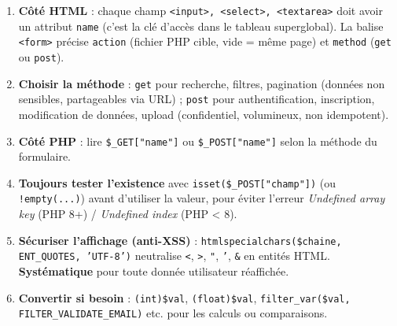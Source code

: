\documentclass[11pt]{article}
\begin{document}
\begin{methode}
\begin{enumerate}
  \item \textbf{Côté HTML} : chaque champ \texttt{<input>, <select>, <textarea>} doit avoir un attribut \texttt{name} (c'est la clé d'accès dans le tableau superglobal). La balise \texttt{<form>} précise \texttt{action} (fichier PHP cible, vide = même page) et \texttt{method} (\texttt{get} ou \texttt{post}).
  \item \textbf{Choisir la méthode} : \texttt{get} pour recherche, filtres, pagination (données non sensibles, partageables via URL) ; \texttt{post} pour authentification, inscription, modification de données, upload (confidentiel, volumineux, non idempotent).
  \item \textbf{Côté PHP} : lire \texttt{\$\_GET["name"]} ou \texttt{\$\_POST["name"]} selon la méthode du formulaire.
  \item \textbf{Toujours tester l'existence} avec \texttt{isset(\$\_POST["champ"])} (ou \texttt{!empty(...)}) avant d'utiliser la valeur, pour éviter l'erreur \emph{Undefined array key} (PHP 8+) / \emph{Undefined index} (PHP < 8).
  \item \textbf{Sécuriser l'affichage (anti-XSS)} : \texttt{htmlspecialchars(\$chaine, ENT\_QUOTES, 'UTF-8')} neutralise \texttt{<}, \texttt{>}, \texttt{"}, \texttt{'}, \texttt{\&} en entités HTML. \textbf{Systématique} pour toute donnée utilisateur réaffichée.
  \item \textbf{Convertir si besoin} : \texttt{(int)\$val}, \texttt{(float)\$val}, \texttt{filter\_var(\$val, FILTER\_VALIDATE\_EMAIL)} etc. pour les calculs ou comparaisons.
\end{enumerate}
\end{methode}
\end{document}
